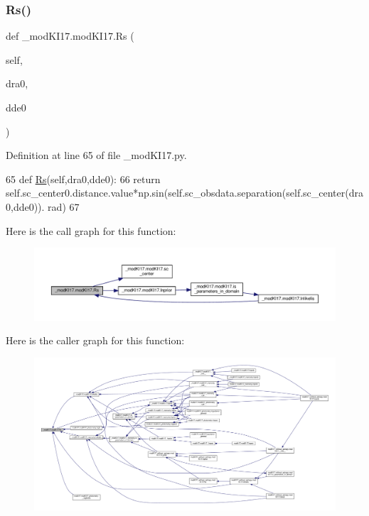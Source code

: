 \subsubsection{\texorpdfstring{Rs()}{Rs()}}
{\footnotesize\ttfamily def \+\_\+mod\+K\+I17.\+mod\+K\+I17.\+Rs (\begin{DoxyParamCaption}\item[{}]{self,  }\item[{}]{dra0,  }\item[{}]{dde0 }\end{DoxyParamCaption})}



Definition at line 65 of file \+\_\+mod\+K\+I17.\+py.


\begin{DoxyCode}
65     \textcolor{keyword}{def }\hyperlink{namespacedsph__model_af25a421d0de32d247b1aa0e8cf4894e3}{Rs}(self,dra0,dde0):
66         \textcolor{keywordflow}{return} self.sc\_center0.distance.value*np.sin(self.sc\_obsdata.separation(self.sc\_center(dra0,dde0)).
      rad)
67 
\end{DoxyCode}
Here is the call graph for this function\+:\nopagebreak
\begin{figure}[H]
\begin{center}
\leavevmode
\includegraphics[width=350pt]{d8/d2c/class__modKI17_1_1modKI17_ae2d06ad8467b3c3ba9bcee127044fe53_cgraph}
\end{center}
\end{figure}
Here is the caller graph for this function\+:\nopagebreak
\begin{figure}[H]
\begin{center}
\leavevmode
\includegraphics[width=350pt]{d8/d2c/class__modKI17_1_1modKI17_ae2d06ad8467b3c3ba9bcee127044fe53_icgraph}
\end{center}
\end{figure}
\mbox{\label{class__modKI17_1_1modKI17_af5fe9e0c29dd12a9a11e5b00f6fc481e}} 
